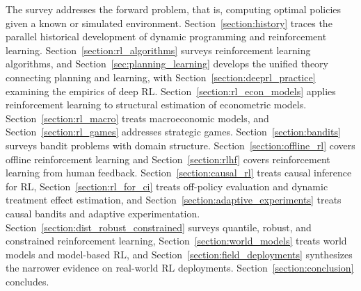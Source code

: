 The survey addresses the forward problem, that is, computing optimal policies given a known or simulated environment. Section~\ref{section:history} traces the parallel historical development of dynamic programming and reinforcement learning. Section~\ref{section:rl_algorithms} surveys reinforcement learning algorithms, and Section~\ref{sec:planning_learning} develops the unified theory connecting planning and learning, with Section~\ref{section:deeprl_practice} examining the empirics of deep RL. Section~\ref{section:rl_econ_models} applies reinforcement learning to structural estimation of econometric models. Section~\ref{section:rl_macro} treats macroeconomic models, and Section~\ref{section:rl_games} addresses strategic games. Section~\ref{section:bandits} surveys bandit problems with domain structure. Section~\ref{section:offline_rl} covers offline reinforcement learning and Section~\ref{section:rlhf} covers reinforcement learning from human feedback. Section~\ref{section:causal_rl} treats causal inference for RL, Section~\ref{section:rl_for_ci} treats off-policy evaluation and dynamic treatment effect estimation, and Section~\ref{section:adaptive_experiments} treats causal bandits and adaptive experimentation. Section~\ref{section:dist_robust_constrained} surveys quantile, robust, and constrained reinforcement learning, Section~\ref{section:world_models} treats world models and model-based RL, and Section~\ref{section:field_deployments} synthesizes the narrower evidence on real-world RL deployments. Section~\ref{section:conclusion} concludes.
